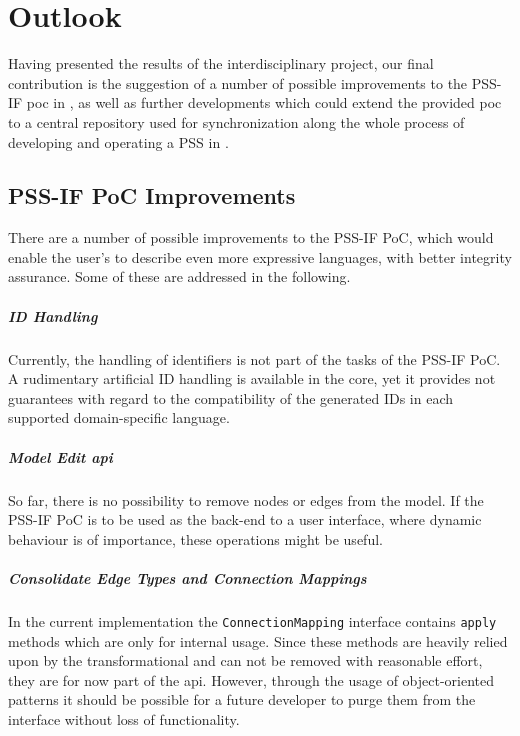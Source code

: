 \chapter{Outlook}
\label{chap:outlook}

Having presented the results of the interdisciplinary project, our final contribution is the suggestion of a number of possible improvements to the PSS-IF \gls{poc} in , as well as further developments which could extend the provided \gls{poc} to a central repository used for synchronization along the whole process of developing and operating a \gls{PSS} in .

\section{PSS-IF PoC Improvements}
\label{sec:outlook:improvements}

There are a number of possible improvements to the PSS-IF PoC, which would enable the user's to describe even more expressive languages, with better integrity assurance. Some of these are addressed in the following.

\paragraph{ID Handling}

Currently, the handling of identifiers is not part of the tasks of the PSS-IF PoC. A rudimentary artificial ID handling is available in the core, yet it provides not guarantees with regard to the compatibility of the generated IDs in each supported domain-specific language.

\paragraph{Model Edit \gls{api}}

So far, there is no possibility to remove nodes or edges from the model. If the PSS-IF PoC is to be used as the back-end to a user interface, where dynamic behaviour is of importance, these operations might be useful.

\paragraph{Consolidate Edge Types and Connection Mappings}

In the current implementation the \texttt{ConnectionMapping} interface contains \texttt{apply} methods which are only for internal usage. Since these methods are heavily relied upon by the transformational and can not be removed with reasonable effort, they are for now part of the \gls{api}. However, through the usage of object-oriented patterns it should be possible for a future developer to purge them from the interface without loss of functionality.

